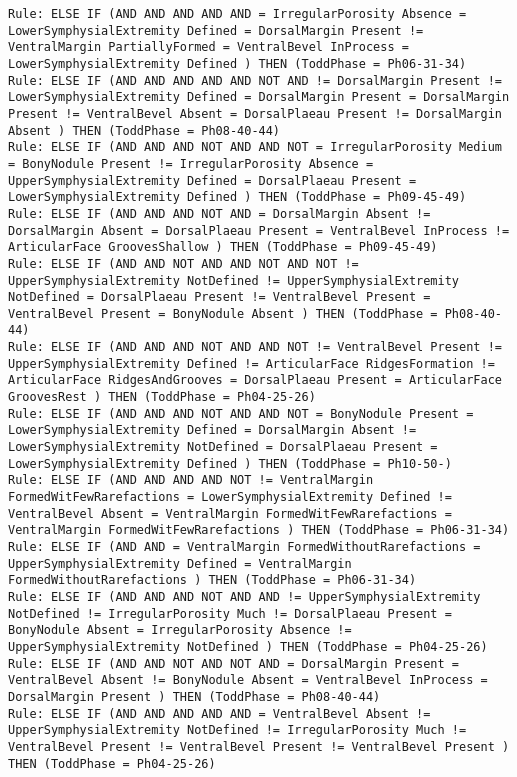 \begin{lstlisting}
Rule: ELSE IF (AND AND AND AND AND = IrregularPorosity Absence = LowerSymphysialExtremity Defined = DorsalMargin Present != VentralMargin PartiallyFormed = VentralBevel InProcess = LowerSymphysialExtremity Defined ) THEN (ToddPhase = Ph06-31-34)
Rule: ELSE IF (AND AND AND AND AND NOT AND != DorsalMargin Present != LowerSymphysialExtremity Defined = DorsalMargin Present = DorsalMargin Present != VentralBevel Absent = DorsalPlaeau Present != DorsalMargin Absent ) THEN (ToddPhase = Ph08-40-44)
Rule: ELSE IF (AND AND AND NOT AND AND NOT = IrregularPorosity Medium = BonyNodule Present != IrregularPorosity Absence = UpperSymphysialExtremity Defined = DorsalPlaeau Present = LowerSymphysialExtremity Defined ) THEN (ToddPhase = Ph09-45-49)
Rule: ELSE IF (AND AND AND NOT AND = DorsalMargin Absent != DorsalMargin Absent = DorsalPlaeau Present = VentralBevel InProcess != ArticularFace GroovesShallow ) THEN (ToddPhase = Ph09-45-49)
Rule: ELSE IF (AND AND NOT AND AND NOT AND NOT != UpperSymphysialExtremity NotDefined != UpperSymphysialExtremity NotDefined = DorsalPlaeau Present != VentralBevel Present = VentralBevel Present = BonyNodule Absent ) THEN (ToddPhase = Ph08-40-44)
Rule: ELSE IF (AND AND AND NOT AND AND NOT != VentralBevel Present != UpperSymphysialExtremity Defined != ArticularFace RidgesFormation != ArticularFace RidgesAndGrooves = DorsalPlaeau Present = ArticularFace GroovesRest ) THEN (ToddPhase = Ph04-25-26)
Rule: ELSE IF (AND AND AND NOT AND AND NOT = BonyNodule Present = LowerSymphysialExtremity Defined = DorsalMargin Absent != LowerSymphysialExtremity NotDefined = DorsalPlaeau Present = LowerSymphysialExtremity Defined ) THEN (ToddPhase = Ph10-50-)
Rule: ELSE IF (AND AND AND AND NOT != VentralMargin FormedWitFewRarefactions = LowerSymphysialExtremity Defined != VentralBevel Absent = VentralMargin FormedWitFewRarefactions = VentralMargin FormedWitFewRarefactions ) THEN (ToddPhase = Ph06-31-34)
Rule: ELSE IF (AND AND = VentralMargin FormedWithoutRarefactions = UpperSymphysialExtremity Defined = VentralMargin FormedWithoutRarefactions ) THEN (ToddPhase = Ph06-31-34)
Rule: ELSE IF (AND AND AND NOT AND AND != UpperSymphysialExtremity NotDefined != IrregularPorosity Much != DorsalPlaeau Present = BonyNodule Absent = IrregularPorosity Absence != UpperSymphysialExtremity NotDefined ) THEN (ToddPhase = Ph04-25-26)
Rule: ELSE IF (AND AND NOT AND NOT AND = DorsalMargin Present = VentralBevel Absent != BonyNodule Absent = VentralBevel InProcess = DorsalMargin Present ) THEN (ToddPhase = Ph08-40-44)
Rule: ELSE IF (AND AND AND AND AND = VentralBevel Absent != UpperSymphysialExtremity NotDefined != IrregularPorosity Much != VentralBevel Present != VentralBevel Present != VentralBevel Present ) THEN (ToddPhase = Ph04-25-26)

\end{lstlisting}
